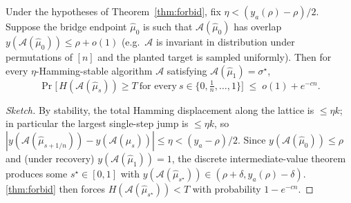 \begin{corollary}\label{cor:hardness}
Under the hypotheses of Theorem~\ref{thm:forbid}, fix $\eta < (y_a(\rho)-\rho)/2$.
Suppose the bridge endpoint $\hat\mu_0$ is such that $\mathcal A(\hat\mu_0)$ has overlap
$y(\mathcal A(\hat\mu_0))\le \rho + o(1)$ (e.g.\ $\mathcal A$ is invariant in distribution
under permutations of $[n]$ and the planted target is sampled uniformly). Then for every
$\eta$-Hamming-stable algorithm $\mathcal A$ satisfying $\mathcal A(\hat\mu_1)=\sigma^\star$,
\[
\Pr\bigl[\,H(\mathcal A(\hat\mu_s))\ge T \ \text{for every}\ s\in\{0,\tfrac1n,\dots,1\}\bigr]
\;\le\; o(1) + e^{-c n}.
\]
\end{corollary}
\begin{proof}[Sketch]
By stability, the total Hamming displacement along the lattice is $\le \eta k$; in particular
the largest single-step jump is $\le \eta k$, so $|y(\mathcal A(\hat\mu_{s+1/n})) -
y(\mathcal A(\hat\mu_s))| \le \eta < (y_a-\rho)/2$. Since
$y(\mathcal A(\hat\mu_0))\le\rho$ and (under recovery) $y(\mathcal A(\hat\mu_1))=1$, the
discrete intermediate-value theorem produces some $s^\star\in[0,1]$ with
$y(\mathcal A(\hat\mu_{s^\star}))\in(\rho+\delta, y_a(\rho)-\delta)$. \cref{thm:forbid}
then forces $H(\mathcal A(\hat\mu_{s^\star}))<T$ with probability $1-e^{-cn}$.
\end{proof}

